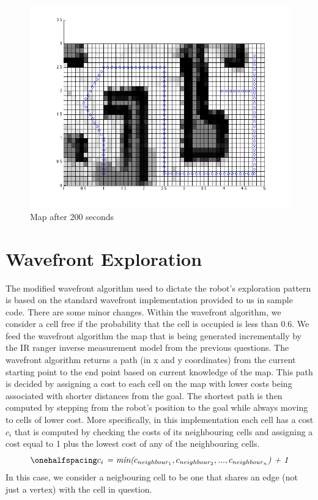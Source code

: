 \documentclass[12pt]{article}
\begin{document}
\begin{figure}[ht]
\hspace{0.5cm}
\centering
\includegraphics[scale=0.5]{Pictures/question3_200.png}
\caption{Map after 200 seconds}
\end{figure}

\newpage
\singlespacing
\section{Wavefront Exploration}
\setlength{\parindent}{1cm}

The modified wavefront algorithm used to dictate the robot's exploration pattern is based on the standard wavefront implementation provided to us in sample code. There are some minor changes. Within the wavefront algorithm, we consider a cell free if the probability that the cell is occupied is less than 0.6. We feed the wavefront algorithm the map that is being generated incrementally by the IR ranger inverse measurement model from the previous questions. The wavefront algorithm returns a path (in x and y coordinates) from the current starting point to the end point based on current knowledge of the map. This path is decided by assigning a cost to each cell on the map with lower costs being associated with shorter distances from the goal. The shortest path is then computed by stepping from the robot's position to the goal while always moving to cells of lower cost. More specifically, in this implementation each cell has a cost \textit{$c_i$} that is computed by checking the costs of its neighbouring cells and assigning a cost equal to 1 plus the lowest cost of any of the neighbouring cells. 
\begin{equation}
\onehalfspacing
\centering
\emph{$c_i$ = min($c_{neighbour_1}, c_{neighbour_2}, ... , c_{neighbour_n}$) + 1}
\end{equation}
In this case, we consider a neigbouring cell to be one that shares an edge (not just a vertex) with the cell in question. 
\end{document}
